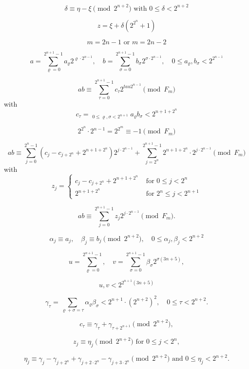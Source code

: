 \documentclass{article}
\begin{document}
\[
\delta \equiv \eta - \xi \pmod{2^{n + 2}}\text{ with }0 \le \delta < 2^{n + 2}
\]

\[
z = \xi + \delta\left(2^{2^n} + 1\right)
\]

\[
\tag{4.8}
m = 2n - 1\text{ or }m = 2n - 2
\]

\[
\tag{4.9}
a = \sum_{\varrho = 0}^{2^{n + 1} - 1} a_\varrho 2^{\varrho \cdot 2^{n - 1}}, \quad b = \sum_{\sigma = 0}^{2^{n + 1} - 1} b_\sigma 2^{\sigma \cdot 2^{n - 1}}, \quad 0 \le a_\varrho, b_\sigma < 2^{2^{n - 1}}
\]

\[
ab \equiv \sum_{\tau = 0}^{2^{n + 1} - 1} c_\tau 2^{tau 2^{n - 1}} \pmod{F_m}
\]
with
\[
\tag{4.10}
c_\tau = \mathop{\sum_{\varrho + \sigma \equiv \tau \pmod{2^{n + 1}}}}_{0 \le \varrho, \sigma < 2^{n + 1}} a_\varrho b_\sigma < 2^{n + 1 + 2^n}
\]

\[
2^{2^n} \cdot 2^{n - 1} = 2^{2^m} \equiv -1 \pmod{F_m}
\]

\[
ab \equiv \sum_{j = 0}^{2^n - 1} \left(c_j - c_{j + 2^n} + 2^{n + 1 + 2^n}\right) 2^{j \cdot 2^{n - 1}} + \sum_{j = 2^n}^{2^{n + 1} - 1} 2^{n + 1 + 2^n} \cdot 2^{j \cdot 2^{n - 1}} \pmod{F_m}
\]
with
\[
\tag{4.11}
z_j =
\begin{cases}
c_j - c_{j + 2^n} + 2^{n + 1 + 2^n} & \text{ for } 0 \le j < 2^n \\
2^{n + 1 + 2^n} & \text{ for } 2^n \le j < 2^{n + 1}
\end{cases}
\]

\[
\tag{4.12}
ab \equiv \sum_{j = 0}^{2^{n + 1} - 1} z_j 2^{j \cdot 2^{n - 1}} \pmod{F_m}.
\]

\[
\alpha_j \equiv a_j, \quad \beta_j \equiv b_j \pmod{2^{n + 2}}, \quad 0 \le \alpha_j, \beta_j < 2^{n + 2}
\]

\[
u = \sum_{\varrho = 0}^{2^{n + 1} - 1}, \quad v = \sum_{\sigma = 0}^{2^{n + 1} - 1} \beta_\sigma 2^{\sigma (3n + 5)},
\]

\[
u, v < 2^{2^{n + 1}(3n + 5)}
\]

\[
\gamma_\tau = \sum_{\varrho + \sigma = \tau} \alpha_\varrho \beta_\sigma < 2^{n + 1} \cdot \left(2^{n + 2}\right)^2, \quad 0 \le \tau < 2^{n + 2}.
\]

\[
c_\tau \equiv \gamma_\tau + \gamma_{\tau + 2^{n + 1}} \pmod{2^{n + 2}},
\]

\[
\tag{4.14}
z_j \equiv \eta_j \pmod{2^{n + 2}}\text{ for }0 \le j < 2^n,
\]

\[
\eta_j \equiv \gamma_j - \gamma_{j + 2^n} + \gamma_{j + 2 \cdot 2^n} - \gamma_{j + 3 \cdot 2^n} \pmod{2^{n + 2}}\text{ and }0 \le \eta_j < 2^{n + 2}.
\]
\end{document}
